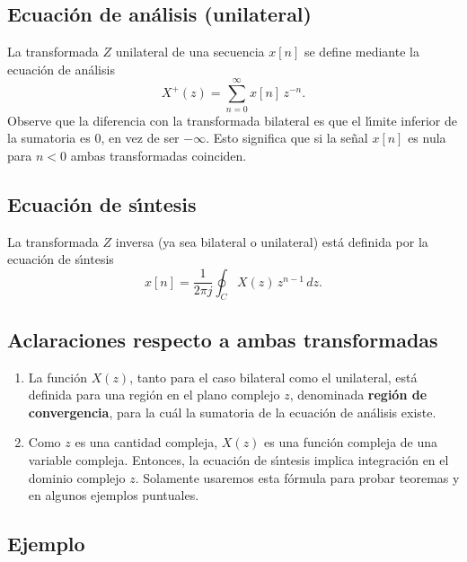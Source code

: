 \subsection{Ecuaci\'{o}n de an\'{a}lisis (unilateral)}
La transformada $Z$ unilateral de una secuencia $x\left[ n\right] $ se define mediante la ecuaci\'{o}n de 
an\'{a}lisis 
\begin{equation}
        X^{+}\left( z\right) =\sum_{n=0}^{\infty }x\left[ n\right] \, z^{-n}.
\end{equation}
Observe que la diferencia con la transformada bilateral es que el l\'{\i}mite inferior de la sumatoria es $0$, en vez de ser $-\infty$. Esto significa que si la se\~{n}al $x[n]$ es nula para $n < 0$ ambas transformadas coinciden.

\subsection{Ecuaci\'{o}n de s\'{\i}ntesis}

La transformada $Z$ inversa (ya sea bilateral o unilateral) est\'{a} definida por la ecuaci\'{o}n de s\'{\i}ntesis 
\begin{equation}
        x\left[ n\right] =\frac{1}{2\pi j}\oint_{C}X\left( z\right) \, z^{n-1} \, dz.
\end{equation}

\subsection{Aclaraciones respecto a ambas transformadas}

\begin{enumerate}

\item La funci\'{o}n $X\left( z\right) $, tanto para el caso bilateral como el unilateral, est\'{a} 
definida para una regi\'{o}n en el plano complejo $z$, denominada \textbf{regi\'{o}n de convergencia}, 
para la cu\'{a}l la sumatoria de la ecuaci\'{o}n de an\'{a}lisis existe.

\item Como $z$ es una cantidad compleja, $X\left( z\right) $ es una funci\'{o}n compleja de una variable 
compleja. Entonces, la ecuaci\'{o}n de s\'{\i}ntesis implica integraci\'{o}n en el dominio complejo $z.$ 
Solamente usaremos esta f\'{o}rmula para probar teoremas y en algunos ejemplos puntuales.

\end{enumerate}

\subsection{Ejemplo} \label{zetaejemplouno}

